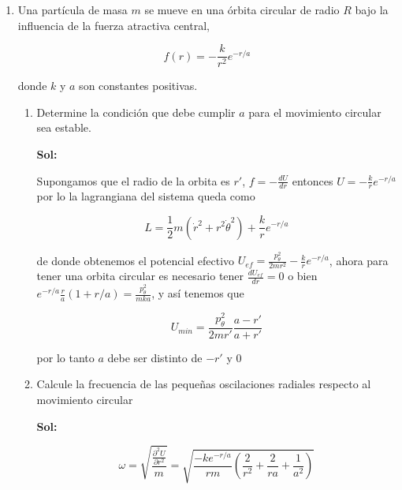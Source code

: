 \documentclass[12pt,a4paper]{article}
\begin{document}
\begin{enumerate}
\begin{enumerate}
    
    
\end{enumerate}






\item Una partícula de masa $m$ se mueve en una órbita circular de radio $R$ bajo la influencia de la fuerza atractiva central,

\begin{equation*}
    f(r) = - \frac{k}{r^2} e^{-r/a}
\end{equation*}

donde $k$ y $a$ son constantes positivas.

\begin{enumerate}
    \item Determine la condición que debe cumplir $a$ para el movimiento circular sea estable.
    
    \textbf{Sol:}
    
    
        Supongamos que el radio de la orbita es $r'$, $f = -\frac{d U}{dr}$ entonces $U= -\frac{k}{r}e^{-r/a}$ por lo la lagrangiana del sistema queda como
        
        \begin{equation*}
            L = \frac{1}{2} m (\dot{r}^2 + r^2 \dot{\theta}^2) + \frac{k}{r} e^{-r/a}
        \end{equation*}
        
        de donde obtenemos el potencial efectivo $U_{ef} = \frac{p_{\theta}^2}{2mr^2} - \frac{k}{r} e^{-r/a}$, ahora para tener una orbita circular es necesario tener $\frac{d U_{ef}}{dr} = 0 $ o bien $e^{-r/a} \frac{r}{a}(1 + r/a) = \frac{p_{\theta}^2}{mka}$, y así tenemos que
        
        \begin{equation*}
            U_{min} = \frac{p_{\theta}^2}{2mr'} \frac{a-r'}{a+r'}
        \end{equation*}
        
        por lo tanto $a$ debe ser distinto de $-r'$ y $0$
    
    \item Calcule la frecuencia de las pequeñas oscilaciones radiales respecto al movimiento circular
    
    \textbf{Sol:}
    
    \begin{equation*}
        \omega = \sqrt{\frac{\frac{\partial^2 U}{\partial r^2}}{m}} = \sqrt{\frac{-ke^{-r/a}}{rm} (\frac{2}{r^2} + \frac{2}{ra} + \frac{1}{a^2})}
    \end{equation*}
    

\end{enumerate}
\end{enumerate}
\end{document}
